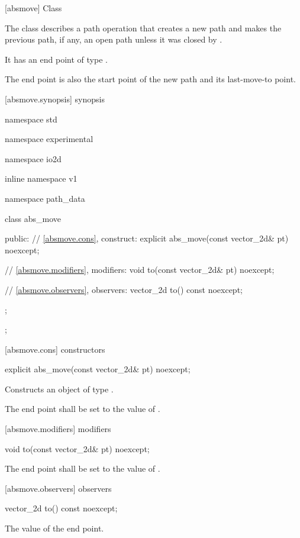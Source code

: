  [absmove] {Class }

\pnum
{}
The class  describes a path operation that creates a new path and makes the previous path, if any, an open path unless it was closed by .

\pnum
It has an end point of type .

\pnum
The end point is also the start point of the new path and its last-move-to point.

 [absmove.synopsis] { synopsis}

\begin{codeblock}
namespace std { namespace experimental { namespace io2d { inline namespace v1 {
  namespace path_data {
    class abs_move {
    public:
      // \ref{absmove.cons}, construct:
      explicit abs_move(const vector_2d& pt) noexcept;

      // \ref{absmove.modifiers}, modifiers:
      void to(const vector_2d& pt) noexcept;

      // \ref{absmove.observers}, observers:
      vector_2d to() const noexcept;
    };
  };
} } } }
\end{codeblock}

 [absmove.cons] { constructors}

\begin{itemdecl}
    explicit abs_move(const vector_2d& pt) noexcept;
\end{itemdecl}
\begin{itemdescr}
	\pnum
	\effects
	Constructs an object of type .
	
	\pnum
	The end point shall be set to the value of .
\end{itemdescr}

 [absmove.modifiers]{ modifiers}

\begin{itemdecl}
    void to(const vector_2d& pt) noexcept;
\end{itemdecl}
\begin{itemdescr}
	\pnum
	\effects
	The end point shall be set to the value of .
\end{itemdescr}

 [absmove.observers]{ observers}

\begin{itemdecl}
    vector_2d to() const noexcept;
\end{itemdecl}
\begin{itemdescr}
	\pnum
	\returns
	The value of the end point.
\end{itemdescr}
